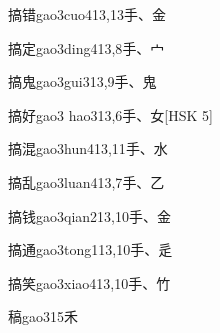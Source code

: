 \begin{EntryWithPhonetic}{搞错}{gao3cuo4}{13,13}{⼿、⾦}
\end{EntryWithPhonetic}

\begin{EntryWithPhonetic}{搞定}{gao3ding4}{13,8}{⼿、⼧}
\end{EntryWithPhonetic}

\begin{EntryWithPhonetic}{搞鬼}{gao3gui3}{13,9}{⼿、⿁}
\end{EntryWithPhonetic}

\begin{EntryWithPhonetic}{搞好}{gao3 hao3}{13,6}{⼿、⼥}[HSK 5]
\end{EntryWithPhonetic}

\begin{EntryWithPhonetic}{搞混}{gao3hun4}{13,11}{⼿、⽔}
\end{EntryWithPhonetic}

\begin{EntryWithPhonetic}{搞乱}{gao3luan4}{13,7}{⼿、⼄}
\end{EntryWithPhonetic}

\begin{EntryWithPhonetic}{搞钱}{gao3qian2}{13,10}{⼿、⾦}
\end{EntryWithPhonetic}

\begin{EntryWithPhonetic}{搞通}{gao3tong1}{13,10}{⼿、⾡}
\end{EntryWithPhonetic}

\begin{EntryWithPhonetic}{搞笑}{gao3xiao4}{13,10}{⼿、⽵}
\end{EntryWithPhonetic}

\begin{EntryWithPhonetic}{稿}{gao3}{15}{⽲}
\end{EntryWithPhonetic}

